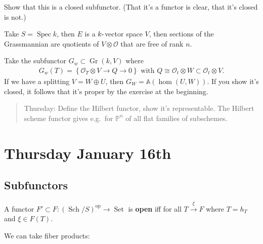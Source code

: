 \begin{description}
Show that this is a closed subfunctor. (That it's a functor is clear,
that it's closed is not.)
\end{description}

Take \(S = \operatorname{Spec}k\), then \(E\) is a \(k{\hbox{-}}\)vector
space \(V\), then sections of the Grassmannian are quotients of
\(V \otimes{\mathcal{O}}\) that are free of rank \(n\).

Take the subfunctor \(G_w \subset {\operatorname{Gr}}(k, V)\) where
\begin{align*}
G_w(T) = \left\{{{\mathcal{O}}_T \otimes V \to Q \to 0}\right\} \text{ with } Q \cong {\mathcal{O}}_t\otimes W \subset {\mathcal{O}}_t \otimes V
.\end{align*}
If we have a splitting \(V = W \oplus U\), then
\(G_W = {\mathbb{A}}(\hom(U, W))\). If you show it's closed, it follows
that it's proper by the exercise at the beginning.

\begin{quote}
Thursday: Define the Hilbert functor, show it's representable. The
Hilbert scheme functor gives e.g.~for \({\mathbb{P}}^n\) of all flat
families of subschemes.
\end{quote}

\hypertarget{thursday-january-16th}{%
\section{Thursday January 16th}\label{thursday-january-16th}}

\hypertarget{subfunctors}{%
\subsection{Subfunctors}\label{subfunctors}}

\begin{description}
\tightlist
\item[Definition (Open Functors)]
A functor
\(F' \subset F: ({\operatorname{Sch}}/S)^\operatorname{op}\to {\operatorname{Set}}\)
is \textbf{open} iff for all \(T \xrightarrow{\xi} F\) where \(T = h_T\)
and \(\xi \in F(T)\).
\end{description}

We can take fiber products:

\begin{center}
\end{center}

